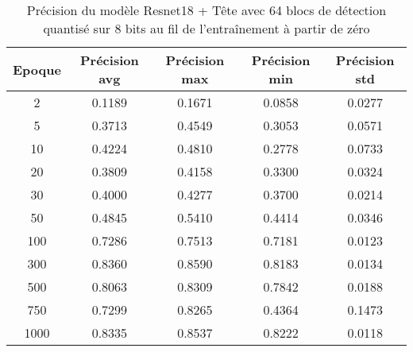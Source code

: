 \begin{table}[!ht]
    \caption{Précision du modèle Resnet18 + Tête avec 64 blocs de détection quantisé sur 8 bits au fil de l'entraînement à partir de zéro}
    \label{tab:qresnet18+head_64n_precision_8b_from_scratch}
    \centering
    \begin{tabular}{ |c||c|c|c|c|  }
        \hline
        \rowcolor{gray!50}
        Epoque & Précision avg & Précision max & Précision min & Précision std\\
        \hline
        2 & 0.1189 & 0.1671 & 0.0858 & 0.0277\\
        5 & 0.3713 & 0.4549 & 0.3053 & 0.0571\\
        10 & 0.4224 & 0.4810 & 0.2778 & 0.0733\\
        20 & 0.3809 & 0.4158 & 0.3300 & 0.0324\\
        30 & 0.4000 & 0.4277 & 0.3700 & 0.0214\\
        50 & 0.4845 & 0.5410 & 0.4414 & 0.0346\\
        100 & 0.7286 & 0.7513 & 0.7181 & 0.0123\\
        300 & 0.8360 & 0.8590 & 0.8183 & 0.0134\\
        500 & 0.8063 & 0.8309 & 0.7842 & 0.0188\\
        750 & 0.7299 & 0.8265 & 0.4364 & 0.1473\\
        1000 & 0.8335 & 0.8537 & 0.8222 & 0.0118\\
        \hline
    \end{tabular}
\end{table}

